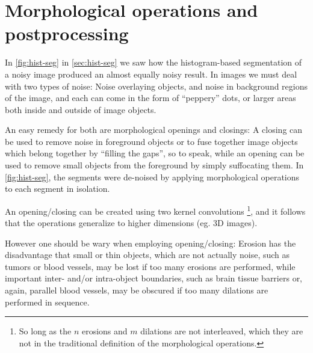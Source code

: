 \section{Morphological operations and postprocessing}
\label{sec:morphs}

In \cref{fig:hist-seg} in \cref{sec:hist-seg} we saw how the histogram-based
segmentation of a noisy image produced an almost equally noisy result. In images
we must deal with two types of noise: Noise overlaying objects, and noise
in background regions of the image, and each can come in the form of ``peppery''
dots, or larger areas both inside and outside of image objects.

An easy remedy for both are morphological openings and closings: A closing can
be used to remove noise in foreground objects or to fuse together image objects
which belong together by ``filling the gaps'', so to speak, while an opening can
be used to remove small objects from the foreground by simply suffocating them.
In \cref{fig:hist-seg}, the segments were de-noised by applying morphological
operations to each segment in isolation.

An opening/closing can be created using two kernel convolutions \footnote{So
long as the $n$ erosions and $m$ dilations are not interleaved, which they are
not in the traditional definition of the morphological operations.}, and it
follows that the operations generalize to higher dimensions (eg. 3D images).

However one should be wary when employing opening/closing: Erosion has the
disadvantage that small or thin objects, which are not actually noise, such as
tumors or blood vessels, may be lost if too many erosions are performed, while
important inter- and/or intra-object boundaries, such as brain tissue barriers
or, again, parallel blood vessels, may be obscured if too many dilations are
performed in sequence.

%

\sectend
